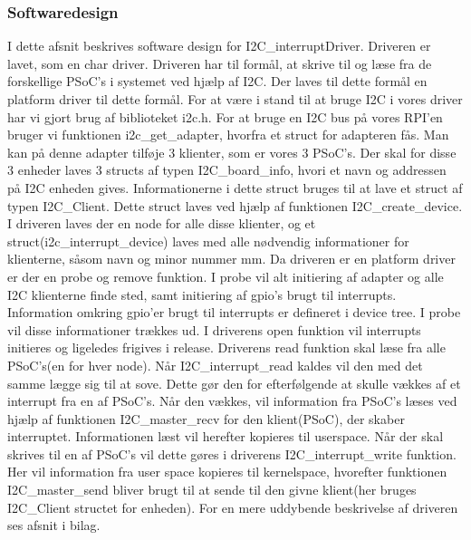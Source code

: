\documentclass[Rapport/RPi/RPI.tex]{subfiles}
\begin{document}
\subsubsection{Softwaredesign}\label{sec:I2C_interruptDriver_design}
I dette afsnit beskrives software design for I2C\_interruptDriver. Driveren er lavet, som en char driver. Driveren har til formål, at skrive til og læse fra de forskellige PSoC's i systemet ved hjælp af I2C. Der laves til dette formål en platform driver til dette formål. For at være i stand til at bruge I2C i vores driver har vi gjort brug af biblioteket i2c.h. For at bruge en I2C bus på vores RPI'en bruger vi funktionen i2c\_get\_adapter, hvorfra et struct for adapteren fås. Man kan på denne adapter tilføje 3 klienter, som er vores 3 PSoC's. Der skal for disse 3 enheder laves 3 structs af typen I2C\_board\_info, hvori et navn og addressen på I2C enheden gives. Informationerne i dette struct bruges til at lave et struct af typen I2C\_Client.  Dette struct laves ved hjælp af funktionen I2C\_create\_device. I driveren laves der en node for alle disse klienter, og et struct(i2c\_interrupt\_device) laves med alle nødvendig informationer for klienterne, såsom navn og minor nummer mm. Da driveren er en platform driver er der en probe og remove funktion. I probe vil alt initiering af adapter og alle I2C klienterne finde sted, samt initiering af gpio's brugt til interrupts. Information omkring gpio'er brugt til interrupts er defineret i device tree. I probe vil disse informationer trækkes ud. I driverens open funktion vil interrupts initieres og ligeledes frigives i release. Driverens read funktion skal læse fra alle PSoC's(en for hver node). Når I2C\_interrupt\_read kaldes vil den med det samme lægge sig til at sove. Dette gør den for efterfølgende at skulle vækkes af et interrupt fra en af PSoC's. Når den vækkes, vil information fra PSoC's læses ved hjælp af funktionen I2C\_master\_recv for den klient(PSoC), der skaber interruptet. Informationen læst vil herefter kopieres til userspace. 
Når der skal skrives til en af PSoC's vil dette gøres i driverens I2C\_interrupt\_write funktion. Her vil information fra user space kopieres til kernelspace, hvorefter funktionen I2C\_master\_send bliver brugt til at sende til den givne klient(her bruges I2C\_Client structet for enheden).
For en mere uddybende beskrivelse af driveren ses afsnit  i bilag.
\end{document}
